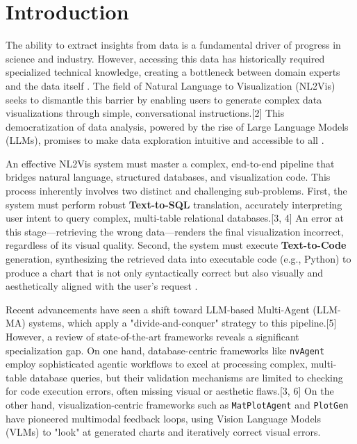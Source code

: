 \documentclass[a4paper,oneside,bibliography=totoc]{scrbook}
\begin{document}
\begingroup
\hypersetup{hidelinks}%
\tableofcontents
\endgroup


\mainmatter

\chapter{Introduction}
\label{ch:intro}

The ability to extract insights from data is a fundamental driver of progress in science and industry. However, accessing this data has historically required specialized technical knowledge, creating a bottleneck between domain experts and the data itself \cite{wu2024automated}. The field of Natural Language to Visualization (NL2Vis) seeks to dismantle this barrier by enabling users to generate complex data visualizations through simple, conversational instructions.[2] This democratization of data analysis, powered by the rise of Large Language Models (LLMs), promises to make data exploration intuitive and accessible to all \cite{wu2024automated, [17]}.

An effective NL2Vis system must master a complex, end-to-end pipeline that bridges natural language, structured databases, and visualization code. This process inherently involves two distinct and challenging sub-problems. First, the system must perform robust \textbf{Text-to-SQL} translation, accurately interpreting user intent to query complex, multi-table relational databases.[3, 4] An error at this stage---retrieving the wrong data---renders the final visualization incorrect, regardless of its visual quality. Second, the system must execute \textbf{Text-to-Code} generation, synthesizing the retrieved data into executable code (e.g., Python) to produce a chart that is not only syntactically correct but also visually and aesthetically aligned with the user's request \cite{yang2024matplotagent, [19]}.

Recent advancements have seen a shift toward LLM-based Multi-Agent (LLM-MA) systems, which apply a "divide-and-conquer" strategy to this pipeline.[5] However, a review of state-of-the-art frameworks reveals a significant specialization gap. On one hand, database-centric frameworks like \texttt{nvAgent} \cite{ouyang2025nvagent} employ sophisticated agentic workflows to excel at processing complex, multi-table database queries, but their validation mechanisms are limited to checking for code execution errors, often missing visual or aesthetic flaws.[3, 6] On the other hand, visualization-centric frameworks such as \texttt{MatPlotAgent} \cite{yang2024matplotagent} and \texttt{PlotGen} \cite{goswami2025plotgen} have pioneered multimodal feedback loops, using Vision Language Models (VLMs) to "look" at generated charts and iteratively correct visual errors. 
\end{document}
